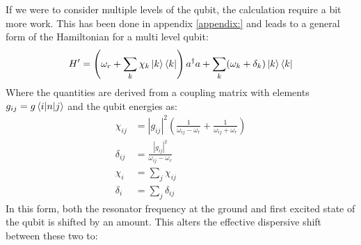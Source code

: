 If we were to consider multiple levels of the qubit, the calculation require a  bit more work. This has been done in appendix \ref{appendix:} and leads to a general form of the Hamiltonian for a multi level qubit:
\begin{equation}\label{eq:multi_qubit_dispersive_hamiltonian}
    H' = \left(\omega_r + \sum_k \chi_k \ket{k}\bra{k} \right) a^\dagger a + \sum_k (\omega_k + \delta_k)\ket{k}\bra{k}
\end{equation}
Where the quantities are derived from a coupling matrix with elements $g_{ij} = g \mel{i}{n}{j}$ and the qubit energies as:
\begin{align}
    \chi_{ij} &= |g_{ij}|^2 \left(\frac{1}{\omega_{ij} - \omega_r} + \frac{1}{\omega_{ij} + \omega_r} \right) \\
    \delta_{ij} &= \frac{|g_{ij}|^2 }{\omega_{ij} - \omega_r} \\
    \chi_{i} &= \sum_j \chi_{ij} \\
    \delta_{i} &= \sum_j \delta_{ij} 
\end{align}
In this form, both the resonator frequency at the ground and first excited state of the qubit is shifted by an amount. This alters the effective dispersive shift between these two to\cite{krantz_quantum_2019}:
